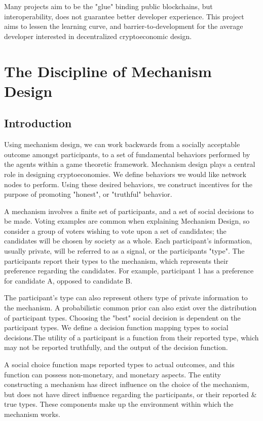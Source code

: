 \documentclass[12pt, titlepage, twocolumn]{report}
\begin{document}
Many projects aim to be the "glue" binding public blockchains, but interoperability, does not guarantee better developer experience. This project aims to lessen the learning curve, and barrier-to-development for the average developer interested in decentralized cryptoeconomic design.


\chapter{The Discipline of Mechanism Design}


\section{Introduction}
Using mechanism design, we can work backwards from a socially acceptable outcome amongst participants, to a set of fundamental behaviors performed by the agents within a game theoretic framework. Mechanism design plays a central role in designing cryptoeconomies. We define behaviors we would like network nodes to perform. Using these desired behaviors, we construct incentives for the purpose of promoting "honest", or "truthful" behavior.

A mechanism involves a finite set of participants, and a set of social decisions to be made. Voting examples are common when explaining Mechanism Design, so consider a group of voters wishing to vote upon a set of candidates; the candidates will be chosen by society as a whole. Each participant's information, usually private, will be referred to as a signal, or the participants "type". The participants report their types to the mechanism, which represents their preference regarding the candidates. For example, participant 1 has a preference for candidate A, opposed to candidate B. 


The participant's type can also represent others type of private information to the mechanism. A probabilistic common prior can also exist over the distribution of participant types. Choosing the "best" social decision is dependent on the participant types. We define a decision function mapping types to social decisions.The utility of a participant is a function from their reported type, which may not be reported truthfully, and the output of the decision function.

A social choice function maps reported types to actual outcomes, and this function can possess non-monetary, and monetary aspects. The entity constructing a mechanism has direct influence on the choice of the mechanism, but does not have direct influence regarding the participants, or their reported \& true types. These components make up the environment within which the mechanism works.
\end{document}
